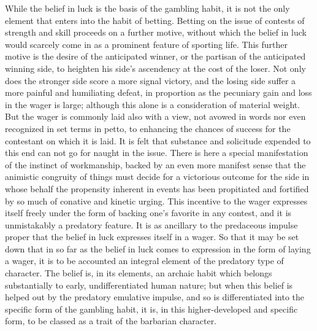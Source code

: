 \documentclass[12pt]{report}
\begin{document}
While the belief in luck is the basis of the gambling habit, it is not
the only element that enters into the habit of betting. Betting on the
issue of contests of strength and skill proceeds on a further motive,
without which the belief in luck would scarcely come in as a prominent
feature of sporting life. This further motive is the desire of the
anticipated winner, or the partisan of the anticipated winning side, to
heighten his side's ascendency at the cost of the loser. Not only does
the stronger side score a more signal victory, and the losing side
suffer a more painful and humiliating defeat, in proportion as the
pecuniary gain and loss in the wager is large; although this alone is
a consideration of material weight. But the wager is commonly laid also
with a view, not avowed in words nor even recognized in set terms in
petto, to enhancing the chances of success for the contestant on which
it is laid. It is felt that substance and solicitude expended to
this end can not go for naught in the issue. There is here a special
manifestation of the instinct of workmanship, backed by an even more
manifest sense that the animistic congruity of things must decide for a
victorious outcome for the side in whose behalf the propensity inherent
in events has been propitiated and fortified by so much of conative
and kinetic urging. This incentive to the wager expresses itself freely
under the form of backing one's favorite in any contest, and it is
unmistakably a predatory feature. It is as ancillary to the predaceous
impulse proper that the belief in luck expresses itself in a wager. So
that it may be set down that in so far as the belief in luck comes
to expression in the form of laying a wager, it is to be accounted an
integral element of the predatory type of character. The belief is, in
its elements, an archaic habit which belongs substantially to early,
undifferentiated human nature; but when this belief is helped out by the
predatory emulative impulse, and so is differentiated into the specific
form of the gambling habit, it is, in this higher-developed and specific
form, to be classed as a trait of the barbarian character.
\end{document}
